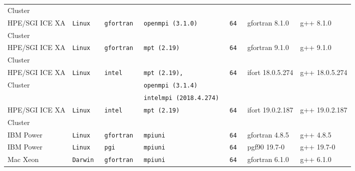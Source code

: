 \begin{longtable}{lllllll}
Cluster        &           &                 &                     &                 &                                     &                                  \\
HPE/SGI ICE XA &\tt Linux  &\tt gfortran     &\tt openmpi \footnotesize (3.1.0)  &\tt 64           & gfortran \footnotesize 8.1.0        & g++ \footnotesize 8.1.0          \\
Cluster        &           &                 &                     &                 &                                     &                                  \\
HPE/SGI ICE XA &\tt Linux  &\tt gfortran     &\tt mpt \footnotesize (2.19)       &\tt 64           & gfortran \footnotesize 9.1.0        & g++ \footnotesize 9.1.0          \\
Cluster        &           &                 &                     &                 &                                     &                                  \\
HPE/SGI ICE XA &\tt Linux  &\tt intel        &\tt mpt \footnotesize (2.19),      &\tt 64           & ifort \footnotesize 18.0.5.274      & g++ \footnotesize 18.0.5.274     \\
Cluster        &           &                 &\tt openmpi \footnotesize (3.1.4)  &                 &                                     &                                  \\
               &           &                 &\tt intelmpi \footnotesize (2018.4.274)  &           &                                     &                                  \\
HPE/SGI ICE XA &\tt Linux  &\tt intel        &\tt mpt \footnotesize (2.19)       &\tt 64           & ifort \footnotesize 19.0.2.187      & g++ \footnotesize 19.0.2.187     \\
Cluster        &           &                 &                     &                 &                                     &                                  \\
IBM Power      &\tt Linux  &\tt gfortran     &\tt mpiuni           &\tt 64           & gfortran \footnotesize 4.8.5        & g++ \footnotesize 4.8.5 \\
IBM Power      &\tt Linux  &\tt pgi          &\tt mpiuni           &\tt 64           & pgf90 \footnotesize 19.7-0          & g++ \footnotesize 19.7-0 \\
Mac Xeon       &\tt Darwin &\tt gfortran     &\tt mpiuni           &\tt 64           & gfortran \footnotesize 6.1.0        & g++ \footnotesize 6.1.0 \\

\end{longtable}

